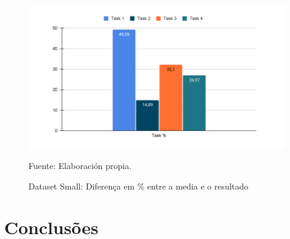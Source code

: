 \documentclass[12pt]{article}
\begin{document}
\begin{figure}[!ht]
	\begin{center}
		\includegraphics[width=1\textwidth]{images/dataset_small_task_percentage}
	\end{center}
	\begin{center}
		\caption{\label{figure:dataset_small_task_percentage}
			\small{Dataset Small: Diferença em \% entre a media e o resultado}}
		{\small{Fuente: Elaboración propia.}}
	\end{center}
\end{figure}



\section{Conclusões}
\end{document}

